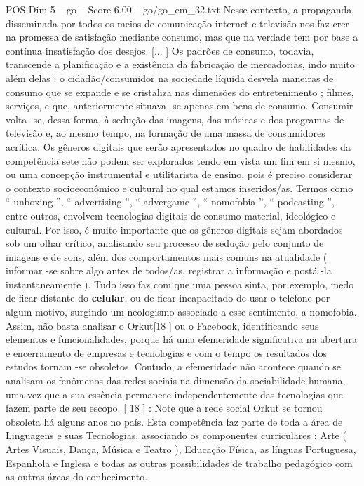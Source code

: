 \begin{textsample}{POS Dim 5 – go – Score 6.00 – go/go\_em\_32.txt}
Nesse contexto, a propaganda, disseminada por todos os meios de comunicação internet e televisão nos faz crer na promessa de satisfação mediante consumo, mas que na verdade tem por base a contínua insatisfação dos desejos. [... ] Os padrões de consumo, todavia, transcende a planificação e a existência da fabricação de mercadorias, indo muito além delas : o cidadão/consumidor na sociedade líquida desvela maneiras de consumo que se expande e se cristaliza nas dimensões do entretenimento ; filmes, serviços, e que, anteriormente situava -se apenas em bens de consumo.
Consumir volta -se, dessa forma, à sedução das imagens, das músicas e dos programas de televisão e, ao mesmo tempo, na formação de uma massa de consumidores acrítica.
Os gêneros digitais que serão apresentados no quadro de habilidades da competência sete não podem ser explorados tendo em vista um fim em si mesmo, ou uma concepção instrumental e utilitarista de ensino, pois é preciso considerar o contexto socioeconômico e cultural no qual estamos inseridos/as.
Termos como “ unboxing ”, “ advertising ”, “ advergame ”, “ nomofobia ”, “ podcasting ”, entre outros, envolvem tecnologias digitais de consumo material, ideológico e cultural.
Por isso, é muito importante que os gêneros digitais sejam abordados sob um olhar crítico, analisando seu processo de sedução pelo conjunto de imagens e de sons, além dos comportamentos mais comuns na atualidade ( informar -se sobre algo antes de todos/as, registrar a informação e postá -la instantaneamente ).
Tudo isso faz com que uma pessoa sinta, por exemplo, medo de ficar distante do \textbf{celular}, ou de ficar incapacitado de usar o telefone por algum motivo, surgindo um neologismo associado a esse sentimento, a nomofobia.
Assim, não basta analisar o Orkut[18 ] ou o Facebook, identificando seus elementos e funcionalidades, porque há uma efemeridade significativa na abertura e encerramento de empresas e tecnologias e com o tempo os resultados dos estudos tornam -se obsoletos.
Contudo, a efemeridade não acontece quando se analisam os fenômenos das redes sociais na dimensão da sociabilidade humana, uma vez que a sua essência permanece independentemente das tecnologias que fazem parte de seu escopo. [ 18 ] : Note que a rede social Orkut se tornou obsoleta há alguns anos no país.
Esta competência faz parte de toda a área de Linguagens e suas Tecnologias, associando os componentes curriculares : Arte ( Artes Visuais, Dança, Música e Teatro ), Educação Física, as línguas Portuguesa, Espanhola e Inglesa e todas as outras possibilidades de trabalho pedagógico com as outras áreas do conhecimento.

\end{textsample}
